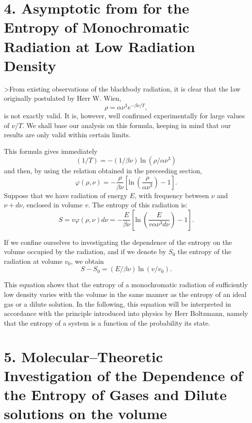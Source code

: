 \documentclass[12pt]{article}
\begin{document}
\vspace{0.5cm}
\section*{
{\bf 4. Asymptotic from for the Entropy of Monochromatic 
Radiation at Low Radiation Density}} 
\vspace{0.5cm}

>From existing observations of the blackbody radiation, it is clear that the law
originally postulated by Herr W. Wien,
$$
\rho = \alpha \nu^3 e^{- \beta \nu/T},
$$
is not exactly valid. It is, however, well confirmed experimentally for large
values of $\nu/T$. We shall base our analysis on this formula, keeping in mind
that our results are only valid within certain limits.

This formula gives immediately
$$
(1/T) = - (1/\beta \nu) ~ \mbox{ln}~ (\rho/\alpha \nu^3)
$$
and then, by using the relation obtained in the preceeding section,
$$
\varphi(\rho, \nu) = - \frac{\rho}{\beta \nu}  \left[ \mbox{ln} ~ 
\left( \frac{\rho}
{\alpha \nu^3} \right) - 1 \right].
$$
Suppose that we have radiation of energy $E$, with frequency between $\nu$ and
$\nu  + d \nu$, enclosed in volume $v$. 
The entropy of this radiation is:
$$
S = v \varphi (\rho, \nu) d\nu = - \frac{E}{\beta \nu}  \left[\mbox{ln}~
 \left( \frac{E}{v \alpha \nu^3 d \nu} \right) - 1 \right].
$$

If we confine ourselves to investigating the dependence of the entropy on the
volume occupied by the radiation, and if we denote by $S_0$ the entropy of the
radiation at volume $v_0$, we obtain 
$$
S - S_0 = (E/\beta \nu) ~ \mbox{ln}~ (v/v_0).
$$

This equation shows that the entropy of a monochromatic radiation of
sufficiently low density varies with the volume in the same manner as the
entropy of an ideal gas or a dilute solution. In the following, this equation
will be interpreted in accordance with the principle introduced into physics by
Herr Boltzmann, namely that the entropy of a system is a function of the
probability its state.

\vspace{0.5cm}
\section*{
{\bf 5. Molecular--Theoretic Investigation of the Dependence
of the Entropy of Gases and Dilute solutions on the volume}}
\vspace{0.5cm}
\end{document}

